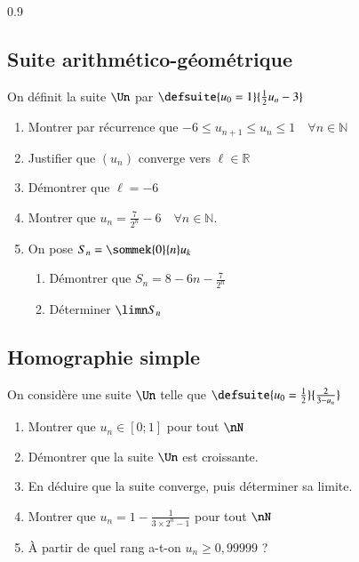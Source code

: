 \documentclass[oneside,12pt]{article}          %
\begin{document}
\begin{spacing}{0.9}
\subsection{Suite arithmético-géométrique}

On définit la suite $\Un$ par $\defsuite{u_0=1}{\frac{1}{2}u_n-3}$
\begin{enumerate}
    \item Montrer par récurrence que $-6 \leq u_{n+1} \leq u_{n} \leq 1 \quad \forall n \in \mathbb{N}$
    \item Justifier que $(u_n)$ converge vers $\ell \in \mathbb{R}$
    \item Démontrer que $\ell = -6$
    \item Montrer que $u_n = \frac{7}{2^n} - 6 \quad \forall n \in \mathbb{N}$.
    \item On pose $S_n=\sommek{0}{n}u_k $ \begin{enumerate}
    	\item Démontrer que $S_n = 8-6n-\frac{7}{2^n}$
    	\item Déterminer $\limn S_n$
    \end{enumerate}
\end{enumerate}

\end{spacing}


\subsection{Homographie simple}
On considère une suite $\Un$ telle que $\defsuite{u_0=\frac{1}{2}}{\frac{2}{3-u_n}}$

\begin{enumerate}
    \item Montrer que $u_n\in[0;1]$ pour tout $\nN$
    \item Démontrer que la suite $\Un$ est croissante.
    \item En déduire que la suite converge, puis déterminer sa limite.
    \item Montrer que $u_n=1-\frac{1}{3\times2^n-1}$ pour tout $\nN$
    \item À partir de quel rang a-t-on $u_n\geq 0,99999$ ?
\end{enumerate}
\end{document}
